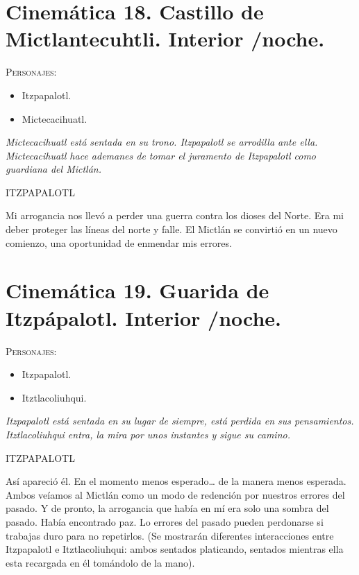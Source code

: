 \documentclass[11pt,letterpaper]{article}
\begin{document}
\section{Cinemática 18. Castillo de Mictlantecuhtli. Interior /noche.}
\textsc{Personajes}:
\begin{itemize}
	\item Itzpapalotl.
	\item Mictecacihuatl.
\end{itemize}

\textit{Mictecacihuatl está sentada en su trono. Itzpapalotl se arrodilla ante ella. Mictecacihuatl hace ademanes de tomar el juramento de Itzpapalotl como guardiana del Mictlán.}
\begin{center}
ITZPAPALOTL
\\
\par
Mi arrogancia nos llevó a perder una guerra contra los dioses del Norte. Era mi deber proteger las líneas del norte y falle. El Mictlán se convirtió en un nuevo comienzo, una oportunidad de enmendar mis errores.
\end{center}

\section{Cinemática 19. Guarida de Itzpápalotl. Interior /noche.}
\textsc{Personajes}:
\begin{itemize}
\item Itzpapalotl.
\item Itztlacoliuhqui. 
\end{itemize}
\textit{Itzpapalotl está sentada en su lugar de siempre, está perdida en sus pensamientos. Itztlacoliuhqui entra, la mira por unos instantes y sigue su camino.}
\begin{center}
ITZPAPALOTL
\\
\par
Así apareció él. En el momento menos esperado… de la manera menos esperada. Ambos veíamos al Mictlán como un modo de redención por nuestros errores del pasado. Y de pronto, la arrogancia que había en mí era solo una sombra del pasado. Había encontrado paz. Lo errores del pasado pueden perdonarse si trabajas duro para no repetirlos. (Se mostrarán diferentes interacciones entre Itzpapalotl e Itztlacoliuhqui: ambos sentados platicando, sentados mientras ella esta recargada en él tomándolo de la mano).
\end{center}
\end{document}
